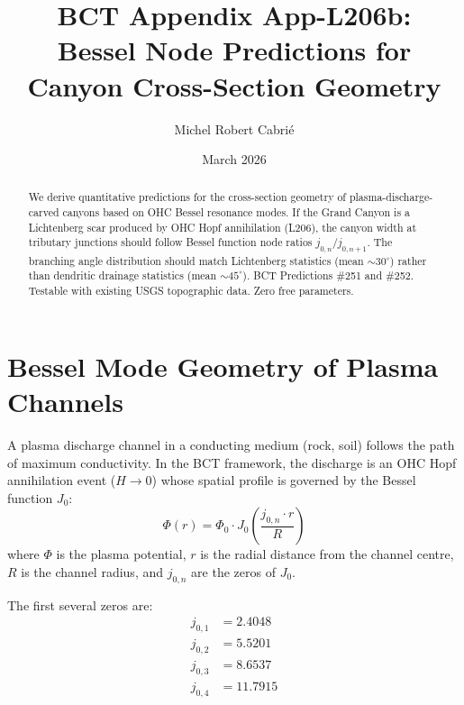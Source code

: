 \documentclass[aps,prl,twocolumn,superscriptaddress]{revtex4-2}
\begin{document}
\title{BCT Appendix App-L206b:\\
Bessel Node Predictions for Canyon Cross-Section Geometry}
\author{Michel Robert Cabri\'e}
\date{March 2026}

\begin{abstract}
We derive quantitative predictions for the cross-section geometry of plasma-discharge-carved canyons based on OHC Bessel resonance modes. If the Grand Canyon is a Lichtenberg scar produced by OHC Hopf annihilation (L206), the canyon width at tributary junctions should follow Bessel function node ratios $j_{0,n}/j_{0,n+1}$. The branching angle distribution should match Lichtenberg statistics (mean $\sim 30^\circ$) rather than dendritic drainage statistics (mean $\sim 45^\circ$). BCT Predictions \#251 and \#252. Testable with existing USGS topographic data. Zero free parameters.
\end{abstract}

\maketitle

\section{Bessel Mode Geometry of Plasma Channels}

A plasma discharge channel in a conducting medium (rock, soil) follows the path of maximum conductivity. In the BCT framework, the discharge is an OHC Hopf annihilation event ($H \to 0$) whose spatial profile is governed by the Bessel function $J_0$:
\begin{equation}
\Phi(r) = \Phi_0 \cdot J_0\left(\frac{j_{0,n} \cdot r}{R}\right)
\end{equation}
where $\Phi$ is the plasma potential, $r$ is the radial distance from the channel centre, $R$ is the channel radius, and $j_{0,n}$ are the zeros of $J_0$.

The first several zeros are:
\begin{align}
j_{0,1} &= 2.4048 \\
j_{0,2} &= 5.5201 \\
j_{0,3} &= 8.6537 \\
j_{0,4} &= 11.7915
\end{align}
\end{document}

